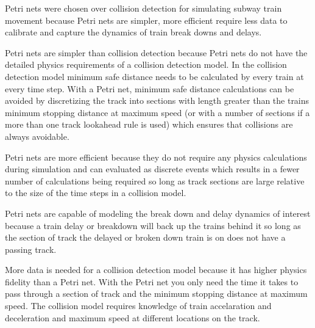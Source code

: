 Petri nets were chosen over collision detection for simulating subway train movement
because Petri nets are simpler, more efficient require less data to calibrate
and capture the dynamics of train break downs and delays. 

Petri nets are simpler than collision detection because Petri nets do not have
the detailed physics requirements of a collision detection model. In the
collision detection model minimum safe distance needs to be calculated by every
train at every time step. With a Petri net, minimum safe distance calculations
can be avoided by discretizing the track into sections with length greater than
the trains minimum stopping distance at maximum speed (or with a number of
sections if a more than one track lookahead rule is used) which ensures that
collisions are always avoidable. 

Petri nets are more efficient because they do not require any physics
calculations during simulation and can evaluated as discrete events which
results in a fewer number of calculations being required so long as track
sections are large relative to the size of the time steps in a collision model.

Petri nets are capable of modeling the break down and delay dynamics of interest
because a train delay or breakdown will back up the trains behind it so long as
the section of track the delayed or broken down train is on does not have a
passing track. 

More data is needed for a collision detection model because it has higher
physics fidelity than a Petri net. With the Petri net you only need the time it
takes to pass through a section of track and the minimum stopping distance at
maximum speed. The collision model requires knowledge of train accelaration and
deceleration and maximum speed at different locations on the track.
